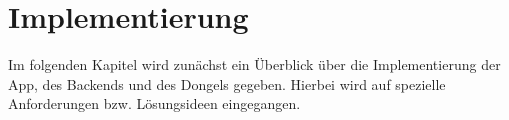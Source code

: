\chapter{Implementierung}
\label{sec:implementation}

Im folgenden Kapitel wird zunächst ein Überblick über die Implementierung der App, des Backends und des Dongels gegeben. Hierbei wird auf spezielle Anforderungen bzw. Lösungsideen eingegangen.





  

 
 
 
 
 
 
 
 